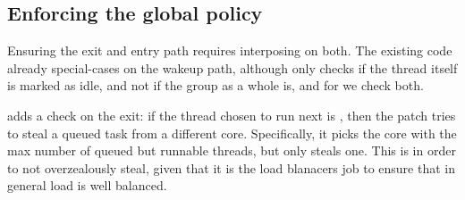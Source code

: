 \subsection{Enforcing the global policy}

Ensuring the exit and entry path requires interposing on both. The existing code
already special-cases on the wakeup path, although only checks if the thread
itself is marked as idle, and not if the group as a whole is, and for \schedbe{}
we check both.

\schedbe{} adds a check on the exit: if the thread chosen to run next is
\schedbe{}, then the patch tries to steal a queued \schednormal{} task from a
different core. Specifically, it picks the core with the max number of queued
but runnable \schednormal{} threads, but only steals one. This is in order to
not overzealously steal, given that it is the load blanacers job to ensure that
in general load is well balanced.